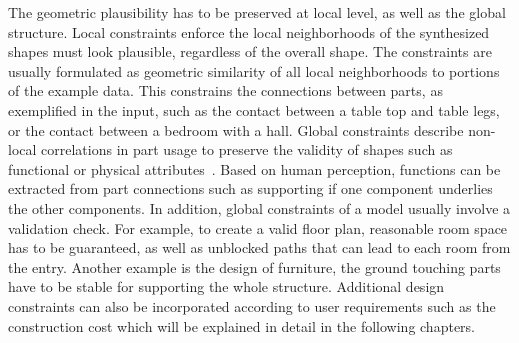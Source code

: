 %
The geometric plausibility has to be preserved at local level, as well as the global structure. Local constraints enforce the local neighborhoods of the synthesized shapes must look plausible, regardless of the overall shape. The constraints are usually formulated as geometric similarity of all local neighborhoods to portions of the example data. This constrains the connections between parts, as exemplified in the input, such as the contact between a table top and table legs, or the contact between a bedroom with a hall. Global constraints describe non-local correlations in part usage to preserve the validity of shapes such as functional or physical attributes~\cite{mitra_howThingsWork_sig_10,Zheng:2013}. Based on human perception, functions can be extracted from part connections such as supporting if one component underlies the other components. In addition, global constraints of a model usually involve a validation check. For example, to create a valid floor plan, reasonable room space has to be guaranteed, as well as unblocked paths that can lead to each room from the entry. Another example is the design of furniture, the ground touching parts have to be stable for supporting the whole structure. Additional design constraints can also be incorporated according to user requirements such as the construction cost which will be explained in detail in the following chapters.


